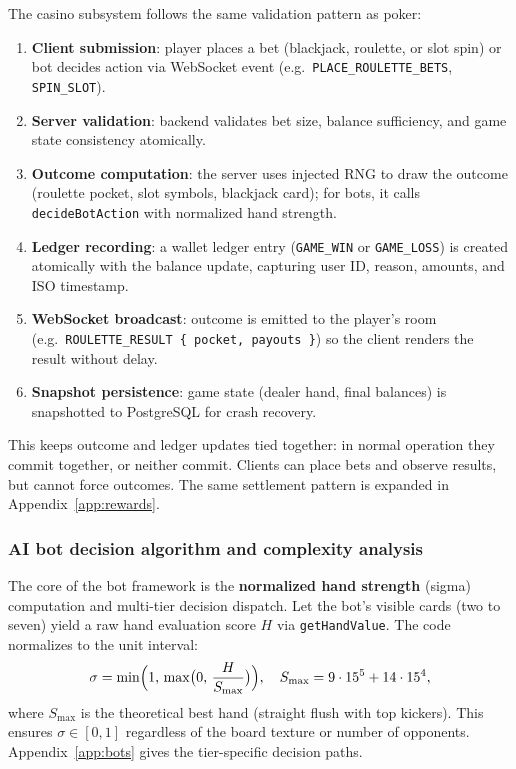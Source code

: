 \documentclass[11pt,a4paper]{article}
\begin{document}
The casino subsystem follows the same validation pattern as poker:

\begin{enumerate}
\item \textbf{Client submission}: player places a bet (blackjack, roulette, or slot spin) or bot decides action via WebSocket event (e.g.\ \texttt{PLACE\_ROULETTE\_BETS}, \texttt{SPIN\_SLOT}).
\item \textbf{Server validation}: backend validates bet size, balance sufficiency, and game state consistency atomically.
\item \textbf{Outcome computation}: the server uses injected RNG to draw the outcome (roulette pocket, slot symbols, blackjack card); for bots, it calls \texttt{decideBotAction} with normalized hand strength.
\item \textbf{Ledger recording}: a wallet ledger entry (\texttt{GAME\_WIN} or \texttt{GAME\_LOSS}) is created atomically with the balance update, capturing user ID, reason, amounts, and ISO timestamp.
\item \textbf{WebSocket broadcast}: outcome is emitted to the player's room (e.g.\ \texttt{ROULETTE\_RESULT \{ pocket, payouts \}}) so the client renders the result without delay.
\item \textbf{Snapshot persistence}: game state (dealer hand, final balances) is snapshotted to PostgreSQL for crash recovery.
\end{enumerate}

This keeps outcome and ledger updates tied together: in normal operation they commit together, or neither commit. Clients can place bets and observe results, but cannot force outcomes. The same settlement pattern is expanded in Appendix~\ref{app:rewards}.

\subsubsection{AI bot decision algorithm and complexity analysis}

The core of the bot framework is the \textbf{normalized hand strength} (sigma) computation and multi-tier decision dispatch. Let the bot's visible cards (two to seven) yield a raw hand evaluation score $H$ via \texttt{getHandValue}. The code normalizes to the unit interval:
\[
\sigma = \min\Bigl(1,\,\max\bigl(0,\,\frac{H}{S_{\max}}\bigr)\Bigr),
\quad
S_{\max} = 9 \cdot 15^5 + 14 \cdot 15^4,
\]
where $S_{\max}$ is the theoretical best hand (straight flush with top kickers). This ensures $\sigma \in [0, 1]$ regardless of the board texture or number of opponents. Appendix~\ref{app:bots} gives the tier-specific decision paths.
\end{document}
